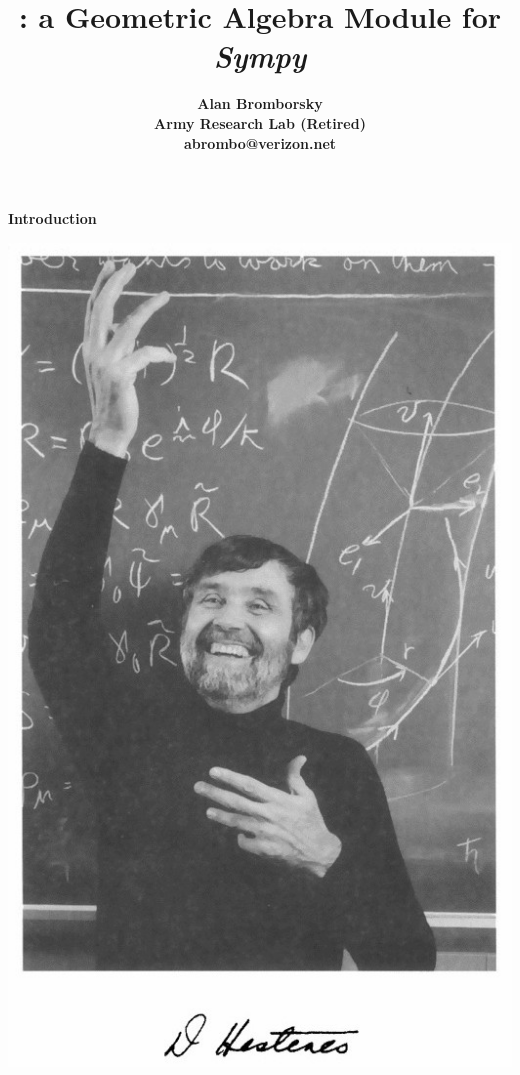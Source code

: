 \documentclass[12pt]{report}
\title{\galgebra: \bf\Large a Geometric Algebra Module for \emph{Sympy}}
\author{\bf Alan Bromborsky\\
\bf Army Research Lab (Retired)\\
\bf abrombo@verizon.net}
\begin{document}
\parskip 10pt

\maketitle
{\bf Introduction}\newline

\begin{center}
\includegraphics[scale=0.25]{dhestenes.jpg} \begin{tabular}{c}

\end{tabular}
\end{center}
\end{document}
